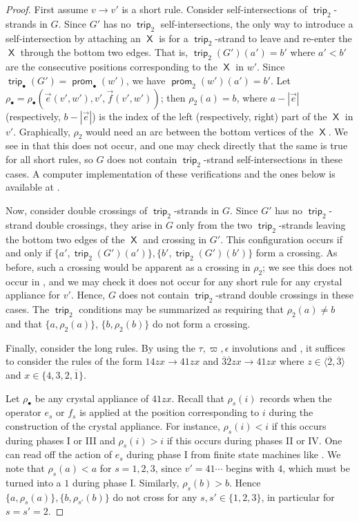 \documentclass{amsart}
\theoremstyle{definition}
\theoremstyle{remark}
\numberwithin{equation}{section}
\DeclareMathOperator{\trip}{\mathsf{trip}}
\DeclareMathOperator{\prom}{\mathsf{prom}}
\DeclareMathOperator{\sfX}{\mathsf{X}}
\begin{document}
\begin{proof}
  First assume $v\to v'$ is a short rule. Consider self-intersections of $\trip_2$-strands in $G$. Since $G'$ has no $\trip_2$ self-intersections, the only way to introduce a self-intersection by attaching an $\sfX$ is for a $\trip_2$-strand to leave and re-enter the $\sfX$ through the bottom two edges. That is, $\trip_2(G')(a') = b'$ where $a' < b'$ are the consecutive positions corresponding to the $\sfX$ in $w'$. Since $\trip_\bullet(G') = \prom_\bullet(w')$, we have $\prom_2(w')(a') = b'$. Let $\rho_\bullet=\rho_\bullet(\vec{e}(v',w'), v', \vec{f}(v',w'))$; then $\rho_2(a) = b$, where $a-|\vec{e}|$ (respectively, $b-|\vec{e}|$) is the index of the left (respectively, right) part of the $\sfX$ in $v'$. Graphically, $\rho_2$ would need an arc between the bottom vertices of the $\sfX$. We see in  that this does not occur, and one may check directly that the same is true for all short rules, so $G$ does not contain $\trip_2$-strand self-intersections in these cases. A computer implementation of these verifications and the ones below is available at \cite[\S7]{sl4-web-basis-code}.

  Now, consider double crossings of $\trip_2$-strands in $G$. Since $G'$ has no $\trip_2$-strand double crossings, they arise in $G$ only from the two $\trip_2$-strands leaving the bottom two edges of the $\sfX$ and crossing in $G'$. This configuration occurs if and only if $\{a', \trip_2(G')(a')\}, \{b', \trip_2(G')(b')\}$ form a crossing. As before, such a crossing would be apparent as a crossing in $\rho_2$; we see this does not occur in , and we may check it does not occur for any short rule for any crystal appliance for $v'$. Hence, $G$ does not contain $\trip_2$-strand double crossings in these cases. The $\trip_2$ conditions may be summarized as requiring that $\rho_2(a) \neq b$ and that $\{a, \rho_2(a)\}$, $\{b, \rho_2(b)\}$ do not form a crossing.

  Finally, consider the long rules. By using the $\tau, \varpi, \epsilon$ involutions and , it suffices to consider the rules of the form $14zx \to 41zx$ and $\overline{3}\overline{2}zx \to 41zx$ where $z \in \langle \overline{2}, \overline{3} \rangle$ and $x \in \{4, 3, 2, \overline{1}\}$.

  Let $\rho_\bullet$ be any crystal appliance of $41zx$. Recall that $\rho_s(i)$ records when the operator $e_s$ or $f_s$ is applied at the position corresponding to $i$ during the construction of the crystal appliance. For instance, $\rho_s(i) < i$ if this occurs during phases I or III and $\rho_s(i) > i$ if this occurs during phases II or IV. One can read off the action of $e_s$ during phase I from finite state machines like . We note that $\rho_s(a) < a$ for $s=1, 2, 3$, since $v' = 41\cdots$ begins with $4$, which must be turned into a $1$ during phase I. Similarly, $\rho_s(b) > b$. Hence $\{a, \rho_s(a)\}, \{b, \rho_{s'}(b)\}$ do not cross for any $s, s' \in \{1, 2, 3\}$, in particular for $s=s'=2$.
\end{proof}
\end{document}

